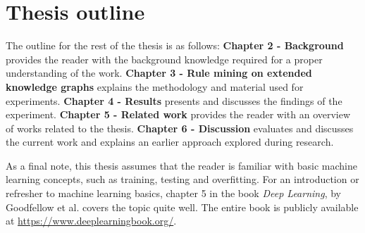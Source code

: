 


\section{Thesis outline}
The outline for the rest of the thesis is as follows: \newline \newline
\textbf{Chapter 2 - Background} provides the reader with the background knowledge required for a proper understanding of the work. \newline
\newline
\textbf{Chapter 3 - Rule mining on extended knowledge graphs} explains the methodology and material used for experiments. \newline
\newline
\textbf{Chapter 4 - Results} presents and discusses the findings of the experiment. \newline \newline
\textbf{Chapter 5 - Related work} provides the reader with an overview of works related to the thesis. \newline \newline
\textbf{Chapter 6 - Discussion} evaluates and discusses the current work and explains an earlier approach explored during research.
\newline \newline

As a final note, this thesis assumes that the reader is familiar with basic machine learning concepts, such as training, testing and overfitting. For an introduction or refresher to machine learning basics, chapter 5 in the book \textit{Deep Learning}, by Goodfellow et al. \cite{goodfellow} covers the topic quite well. The entire book is publicly available at \href{https://www.deeplearningbook.org/}{https://www.deeplearningbook.org/}.